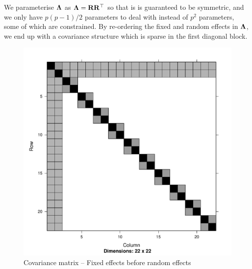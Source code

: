 \documentclass{amsart}[12pt]
\begin{document}
	We parameterise ${\boldsymbol \Lambda}$ as ${\boldsymbol \Lambda} = {\bf R} {\bf R}^\top$ so that is is guaranteed to be symmetric, and
	we only have $p(p-1)/2$ parameters to deal with instead of $p^2$ parameters, some of which are constrained. By re-ordering the fixed and random effects in ${\boldsymbol \Lambda}$, we end up with a covariance structure which is sparse in the first diagonal block.
	
	\begin{figure}[p]
		\caption{\tiny Covariance matrix -- Fixed effects before random effects}
		\label{fig:covfixedrandom}
		\includegraphics[scale=.25]{mX_mZ_mLambda.pdf}
	\end{figure}
	
\end{document}
